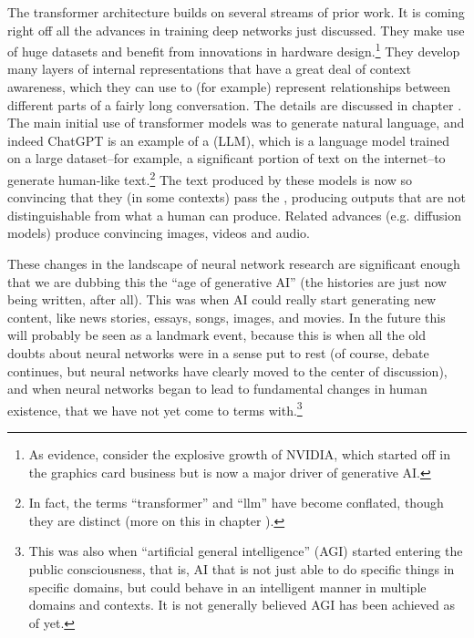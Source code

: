 The transformer architecture builds on several streams of prior work. It is coming right off all the advances in training deep networks just discussed. They make use of huge datasets and benefit from innovations in hardware design.\footnote{As evidence, consider the explosive growth of NVIDIA, which started off in the graphics card business but is now a major driver of generative AI.} They develop many layers of internal representations that have a great deal of context awareness, which they can use to (for example) represent relationships between different parts of a fairly long conversation. The details are discussed in chapter . The main initial use of transformer models was to generate natural language, and indeed ChatGPT is an example of a  (LLM), which is a language model trained on a large dataset--for example, a significant portion of text on the internet--to generate human-like text.\footnote{In fact, the terms ``transformer'' and ``llm'' have become conflated, though they are distinct (more on this in chapter ).}  The text produced by these models is now so convincing that they (in some contexts) pass the , producing outputs that are not distinguishable from what a human can produce. Related advances (e.g. diffusion models) produce convincing images, videos and audio. 

These changes in the landscape of neural network research are significant enough that we are dubbing this the ``age of generative AI'' (the histories are just now being written, after all). This was when AI could really start generating new content, like news stories, essays, songs, images, and movies. In the future this will probably be seen as a landmark event, because this is when all the old doubts about neural networks were in a sense put to rest (of course, debate continues, but neural networks have clearly moved to the center of discussion), and when neural networks began to lead to fundamental changes in human existence, that we have not yet come to terms with.\footnote{This was also when ``artificial general intelligence'' (AGI) started entering the public consciousness, that is, AI that is not just able to do specific things in specific domains, but could behave in an intelligent manner in multiple domains and contexts. It is not generally believed AGI has been achieved as of yet.}

